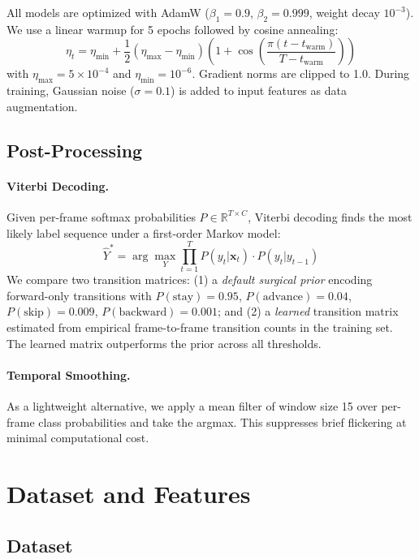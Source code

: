 \documentclass[10pt,twocolumn]{article}
\begin{document}
All models are optimized with AdamW ($\beta_1 = 0.9$, $\beta_2 = 0.999$, weight decay $10^{-3}$). We use a linear warmup for 5 epochs followed by cosine annealing:
\[
\eta_t = \eta_\text{min} + \frac{1}{2}(\eta_\text{max} - \eta_\text{min})\left(1 + \cos\!\left(\frac{\pi(t - t_\text{warm})}{T - t_\text{warm}}\right)\right)
\]
with $\eta_\text{max} = 5 \times 10^{-4}$ and $\eta_\text{min} = 10^{-6}$. Gradient norms are clipped to 1.0. During training, Gaussian noise ($\sigma = 0.1$) is added to input features as data augmentation.

\subsection{Post-Processing}

\paragraph{Viterbi Decoding.} Given per-frame softmax probabilities $P \in \mathbb{R}^{T \times C}$, Viterbi decoding finds the most likely label sequence under a first-order Markov model:
\[
\hat{Y}^* = \arg\max_{Y} \prod_{t=1}^{T} P(y_t | \mathbf{x}_t) \cdot P(y_t | y_{t-1})
\]
We compare two transition matrices: (1) a \emph{default surgical prior} encoding forward-only transitions with $P(\text{stay}) = 0.95$, $P(\text{advance}) = 0.04$, $P(\text{skip}) = 0.009$, $P(\text{backward}) = 0.001$; and (2) a \emph{learned} transition matrix estimated from empirical frame-to-frame transition counts in the training set. The learned matrix outperforms the prior across all thresholds.

\paragraph{Temporal Smoothing.} As a lightweight alternative, we apply a mean filter of window size 15 over per-frame class probabilities and take the argmax. This suppresses brief flickering at minimal computational cost.

\section{Dataset and Features}

\subsection{Dataset}
\end{document}
